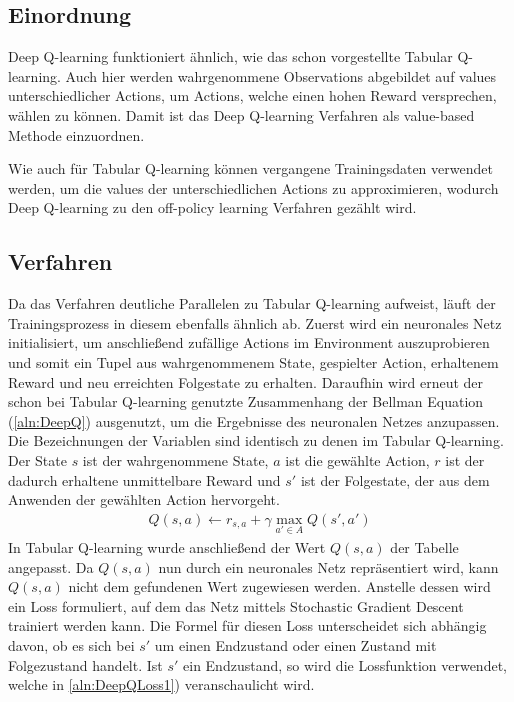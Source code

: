\documentclass[11pt]{scrartcl}
\begin{document}
\subsection{Einordnung}
Deep Q-learning funktioniert ähnlich, wie das schon vorgestellte Tabular Q-learning. Auch
hier werden wahrgenommene Observations abgebildet auf values unterschiedlicher Actions, um
Actions, welche einen hohen Reward versprechen, wählen zu können. Damit ist das Deep 
Q-learning Verfahren als value-based Methode einzuordnen.

Wie auch für Tabular Q-learning können vergangene Trainingsdaten verwendet werden, um die
values der unterschiedlichen Actions zu approximieren, wodurch Deep Q-learning zu den
off-policy learning Verfahren gezählt wird.

\subsection{Verfahren}
\label{sec:deepq-procedure}
Da das Verfahren deutliche Parallelen zu Tabular Q-learning aufweist, läuft der
Trainingsprozess in diesem ebenfalls ähnlich ab. Zuerst wird ein neuronales Netz
initialisiert, um anschließend zufällige Actions im Environment auszuprobieren
und somit ein Tupel aus wahrgenommenem State, gespielter Action, erhaltenem
Reward und neu erreichten Folgestate zu erhalten. Daraufhin wird erneut der schon
bei Tabular Q-learning genutzte Zusammenhang der Bellman Equation (\ref{aln:DeepQ})
ausgenutzt, um die Ergebnisse des neuronalen Netzes anzupassen. Die Bezeichnungen
der Variablen sind identisch zu denen im Tabular Q-learning. Der State $s$ ist der
wahrgenommene State, $a$ ist die gewählte Action, $r$ ist der dadurch erhaltene
unmittelbare Reward und $s'$ ist der Folgestate, der aus dem Anwenden der gewählten
Action hervorgeht.
\begin{align}
  Q(s, a) \leftarrow r_{s,a} + \gamma \max_{a' \in A}Q(s', a') \label{aln:DeepQ}
\end{align}
\noindent
In Tabular Q-learning wurde anschließend der Wert $Q(s, a)$ der Tabelle angepasst. Da 
$Q(s, a)$ nun durch ein neuronales Netz repräsentiert wird, kann $Q(s, a)$ nicht dem
gefundenen Wert zugewiesen werden. Anstelle dessen wird ein Loss formuliert, auf dem
das Netz mittels Stochastic Gradient Descent trainiert werden kann. Die Formel für
diesen Loss unterscheidet sich abhängig davon, ob es sich bei $s'$ um einen Endzustand
oder einen Zustand mit Folgezustand handelt. Ist $s'$ ein Endzustand, so wird die
Lossfunktion verwendet, welche in \autoref{aln:DeepQLoss1}) veranschaulicht wird.
\end{document}
